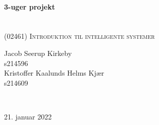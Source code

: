 \begin{titlepage}
	
	
	\HRule\\[0.5cm]
	
	{\huge\bfseries  3-uger projekt \\ }\\[0.4cm] %

	\HRule\\[0.5cm]
	
	\textsc{\Large (02461) Introduktion til intelligente systemer}\\[1cm] %
	
    \begin{minipage}{0.5\textwidth}
		\begin{flushleft}
            \centering
            
            Jacob Seerup Kirkeby \\ 
            s214596 \\[0.8cm]
            
            Kristoffer Kaalunds Helms Kjær \\
            s214609 \\[0.8cm]

		\end{flushleft}
	\end{minipage} 
    \\[1cm]
    \vfill \vfill


    


	
	\vfill\vfill\vfill %
	
	{\large 21. januar 2022} %
	
	\vfill %
	
\end{titlepage}